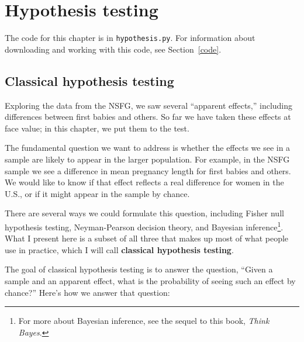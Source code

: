 \documentclass[12pt]{book}
\theoremstyle{exercise}
\begin{document}
\chapter{Hypothesis testing}%
\label{testing}

The code for this chapter is in {\tt hypothesis.py}.  For information
about downloading and working with this code, see Section~\ref{code}.

\section{Classical hypothesis testing}%
%

Exploring the data from the NSFG, we saw several ``apparent effects,''
including differences between first babies and others.
So far we have taken these effects at face value; in this chapter,
we put them to the test.%
%

The fundamental question we want to address is whether the effects
we see in a sample are likely to appear in the larger population.
For example, in the NSFG sample we see a difference in mean pregnancy
length for first babies and others.  We would like to know if
that effect reflects a real difference for women
in the U.S., or if it might appear in the sample by chance.%
%

There are several ways we could formulate this question, including
Fisher null hypothesis testing, Neyman-Pearson decision theory, and
Bayesian inference\footnote{For more about Bayesian inference, see the
  sequel to this book, {\it Think Bayes}.}.  What I present here is a
subset of all three that makes up most of what people use in practice,
which I will call {\bf classical hypothesis testing}.%
%

The goal of classical hypothesis testing is to answer the question,
``Given a sample and an apparent effect, what is the probability of
seeing such an effect by chance?''  Here's how we answer that question:
\end{document}

